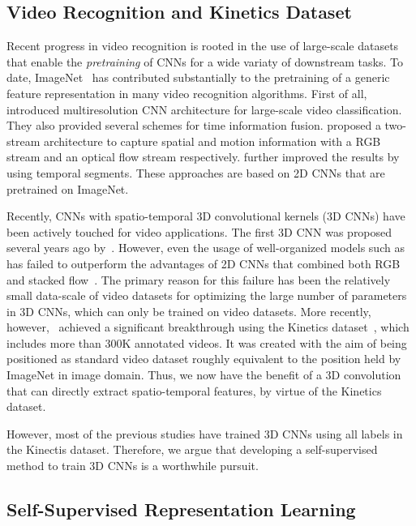 \documentclass[letterpaper]{article} \usepackage{aaai19}  \usepackage{times}  \usepackage{helvet}  \usepackage{courier}  \usepackage{url}  \usepackage{graphicx}  \frenchspacing  \setlength{\pdfpagewidth}{8.5in}  \setlength{\pdfpageheight}{11in}
\begin{document}
\subsection{Video Recognition and Kinetics Dataset}
Recent progress in video recognition is rooted in the use of large-scale datasets that enable the \textit{pretraining} of CNNs for a wide variaty of downstream tasks. To date, ImageNet~\cite{imagenet} has contributed substantially to the pretraining of a generic feature representation in many video recognition algorithms. 
First of all, \cite{karpathy2014large} introduced multiresolution CNN architecture for large-scale video classification. They also provided several schemes for time information fusion. 
\cite{simonyan2014two} proposed a two-stream architecture to capture spatial and motion information with a RGB stream and an optical flow stream respectively. \cite{Wang2016segment} further improved the results by using temporal segments. These approaches are based on 2D CNNs that are pretrained on ImageNet.

Recently, CNNs with spatio-temporal 3D convolutional kernels (3D CNNs) have been actively touched for video applications. The first 3D CNN was proposed several years ago by~\cite{Ji20133Dconv}. However, even the usage of well-organized models such as~\cite{Tran2015spatiotemporal} has failed to outperform the advantages of 2D CNNs that combined both RGB and stacked flow~\cite{simonyan2014two}.
The primary reason for this failure has been the relatively small data-scale of video datasets for optimizing the large number of parameters in 3D CNNs, which can only be trained on video datasets. More recently, however,~\cite{carreira2017quo} achieved a significant breakthrough using the Kinetics dataset~\cite{Kinetics}, which includes more than 300K annotated videos. It was created with the aim of being positioned as standard video dataset roughly equivalent to the position held by ImageNet in image domain.  Thus, we now have the benefit of a 3D convolution that can directly extract spatio-temporal features, by virtue of the Kinetics dataset. 

However, most of the previous studies have trained 3D CNNs using all labels in the Kinectis dataset. Therefore, we argue that developing a self-supervised method to train 3D CNNs is a worthwhile pursuit.



\subsection{Self-Supervised Representation Learning}
\end{document}
